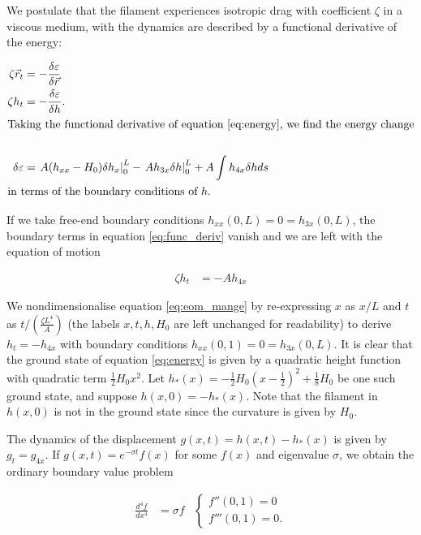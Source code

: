 We postulate that the filament experiences isotropic drag with coefficient $\zeta$ in a viscous medium, with the dynamics are described by a functional derivative of the energy:

\begin{align}
    \zeta \vec{r}_t &= -\frac{\delta \varepsilon}{\delta \vec{r}} \nonumber \\
    \zeta h_t &= -\frac{\delta \varepsilon}{\delta h}. \label{eq:eom} \\
    \intertext{Taking the functional derivative of equation \ref{eq:energy}, we find the energy change} \nonumber \\
    \delta \varepsilon &= \left. A(h_{xx} - H_0)\delta h_x \right|_0^L - \left. Ah_{3x} \delta h \right|_0^L + A \int h_{4x} \delta h ds \label{eq:func_deriv} \\
    \intertext{in terms of the boundary conditions of $h$.}
\end{align}

If we take free-end boundary conditions $h_{xx}(0, L) = 0 = h_{3x}(0, L)$, the boundary terms in equation \ref{eq:func_deriv} vanish and we are left with the equation of motion 

\begin{align}
    \zeta h_t &= -A h_{4x} \label{eq:eom_mange}
\end{align}

We nondimensionalise equation \ref{eq:eom_mange} by re-expressing $x$ as $x/L$ and $t$ as $t / (\frac{\zeta L^4}{A})$ (the labels $x, t, h, H_0$ are left unchanged for readability) to derive $h_t = -h_{4x}$ with boundary conditions $h_{xx}(0, 1) = 0 = h_{3x}(0, L)$. It is clear that the ground state of equation \ref{eq:energy} is given by a quadratic height function with quadratic term $\frac{1}{2}H_0x^2$. Let $h_*(x) = -\frac{1}{2} H_0(x-\frac{1}{2})^2 + \frac{1}{8}H_0$ be one such ground state, and suppose $h(x, 0) = -h_*(x)$. Note that the filament in $h(x, 0)$ is not in the ground state since the curvature is given by $H_0$. 

The dynamics of the displacement $g(x, t) = h(x, t) - h_*(x)$ is given by $g_t = g_{4x}$. If $g(x, t) = e^{-\sigma t} f(x)$ for some $f(x)$ and eigenvalue $\sigma$, we obtain the ordinary boundary value problem 

\begin{align}
    \frac{d^4f}{dx^4} &= \sigma f & \begin{cases} f''(0, 1) = 0 \\ f'''(0, 1) = 0. \end{cases} \label{eq:bvp}
\end{align}

